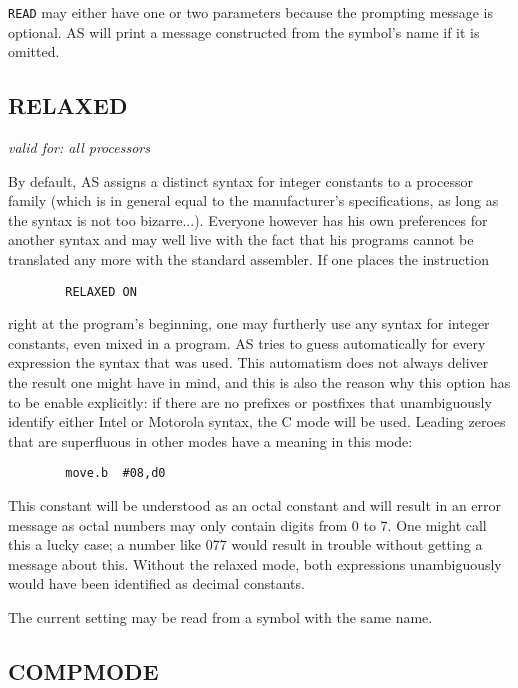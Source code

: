 \documentclass[12pt,twoside]{report}
\makeatletter
\newcommand{\tty}[1]{{\tt #1}}
\newcommand{\ttindex}[1]{\index{#1@{\tt #1}}}
\makeatother
\begin{document}
\tty{READ} may either have one or two parameters because the prompting
message is optional.  AS will print a message constructed from the
symbol's name if it is omitted.


\subsection{RELAXED}
\label{SectRELAXED}
\ttindex{RELAXED}

{\em valid for: all processors}

By default, AS assigns a distinct syntax for integer constants to a
processor family (which is in general equal to the manufacturer's
specifications, as long as the syntax is not too bizarre...).
Everyone however has his own preferences for another syntax and may
well live with the fact that his programs cannot be translated any
more with the standard assembler.  If one places the instruction
\begin{verbatim}
        RELAXED ON
\end{verbatim}
right at the program's beginning, one may furtherly use any syntax
for integer constants, even mixed in a program.  AS tries to guess
automatically for every expression the syntax that was used.  This
automatism does not always deliver the result one might have in mind,
and this is also the reason why this option has to be enable
explicitly: if there are no prefixes or postfixes that unambiguously
identify either Intel or Motorola syntax, the C mode will be used.
Leading zeroes that are superfluous in other modes have a meaning in
this mode:
\begin{verbatim}
        move.b  #08,d0
\end{verbatim}
This constant will be understood as an octal constant and will result
in an error message as octal numbers may only contain digits from 0
to 7.  One might call this a lucky case; a number like 077 would
result in trouble without getting a message about this.  Without the
relaxed mode, both expressions unambiguously would have been
identified as decimal constants.

The current setting may be read from a symbol with the same name.


\subsection{COMPMODE}
\label{SectCompMode}
\ttindex{COMPMODE}
\end{document}
